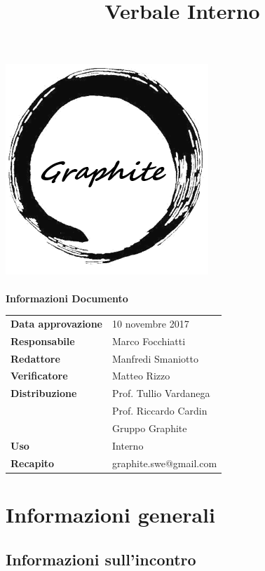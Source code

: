 \documentclass[openany,12pt,a4paper]{article}
\title{Verbale Interno}
\author{}
\begin{document}
	\makeatletter
	\begin{titlepage}
		\setlength{\headsep}{0pt}  
		\begin{center}
			\includegraphics[width=0.5\linewidth]{Logo.png}\\[1em]
			{\huge \bfseries  \@title }\\[10ex]
			\textbf{\Large Informazioni Documento} \\[2em]
			\bgroup
			\def\arraystretch{1.5}
			\begin{tabular}{l|l}
				\textbf{Data approvazione} & 10 novembre 2017 \\
				\textbf{Responsabile} & Marco Focchiatti \\
				\textbf{Redattore} & Manfredi Smaniotto \\
				\textbf{Verificatore} & Matteo Rizzo \\
				\textbf{Distribuzione} & Prof. Tullio Vardanega \\
				 & Prof. Riccardo Cardin \\
				 & Gruppo Graphite \\
				\textbf{Uso} & Interno \\
				\textbf{Recapito} & graphite.swe@gmail.com \\
			\end{tabular}
		\egroup
		\end{center}
	\end{titlepage}
	\makeatother

	\thispagestyle{empty}
	\newpage
	
	\tableofcontents
	\newpage
	
	\section{Informazioni generali}
	
	\subsection{Informazioni sull'incontro}
	
\end{document}
